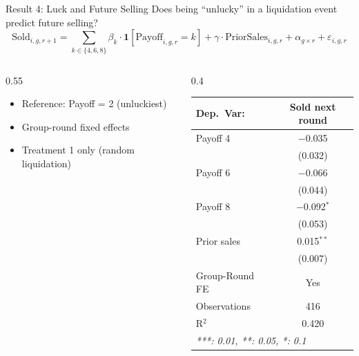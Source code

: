 \documentclass{beamer}
\begin{document}
\begin{frame}{Result 4: Luck and Future Selling}
Does being ``unlucky'' in a liquidation event predict future selling?
\begin{equation*}
\text{Sold}_{i,g,r+1} = \sum_{k \in \{4,6,8\}} \beta_k \cdot \mathbf{1}[\text{Payoff}_{i,g,r} = k] + \gamma \cdot \text{PriorSales}_{i,g,r} + \alpha_{g \times r} + \varepsilon_{i,g,r}
\end{equation*}

\begin{columns}[T]
\begin{column}{0.55\textwidth}
\begin{itemize}
    \item Reference: Payoff = 2 (unluckiest)
    \item Group-round fixed effects
    \item Treatment 1 only (random liquidation)
\end{itemize}
\end{column}
\begin{column}{0.4\textwidth}
\vspace{-0.3cm}
\centering
\scriptsize
\begin{tabular}{@{}lc@{}}
   \midrule \midrule
   Dep.\ Var:    & Sold next round \\
   \midrule
   Payoff 4                & $-$0.035\\
                           & (0.032)\\
   Payoff 6                & $-$0.066\\
                           & (0.044)\\
   Payoff 8                & $-$0.092$^{*}$\\
                           & (0.053)\\
   Prior sales             & 0.015$^{**}$\\
                           & (0.007)\\
   \midrule
   Group-Round FE          & Yes\\
   Observations            & 416\\
   R$^2$                   & 0.420\\
   \midrule \midrule
   \multicolumn{2}{l}{\tiny\emph{***: 0.01, **: 0.05, *: 0.1}}\\
\end{tabular}
\end{column}
\end{columns}
\end{frame}
\end{document}
